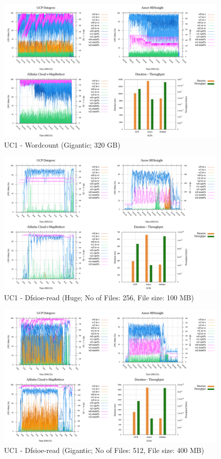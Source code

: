\documentclass[review]{elsarticle}
\begin{document}
\begin{figure}[p]
	\includegraphics[width=\textwidth]{uc1-wrdcnt-g-cmidt}
	\caption{UC1 - Wordcount (Gigantic; 320 GB)}
	\label{fig:uc1-wrdcnt-g-cmidt}
	\centering
\end{figure}

\begin{figure}[p]
	\includegraphics[width=\textwidth]{uc1-dfsioer-h-cmidt}
	\caption{UC1 - Dfsioe-read (Huge; No of Files: 256, File size: 100 MB)}
	\label{fig:uc1-dfsioer-h-cmidt}
	\centering
\end{figure}

\begin{figure}[p]
	\includegraphics[width=\textwidth]{uc1-dfsioer-g-cmidt}
	\caption{UC1 - Dfsioe-read (Gigantic; No of Files: 512, File size: 400 MB)}
	\label{fig:uc1-dfsioer-g-cmidt}
	\centering
\end{figure}
\end{document}
